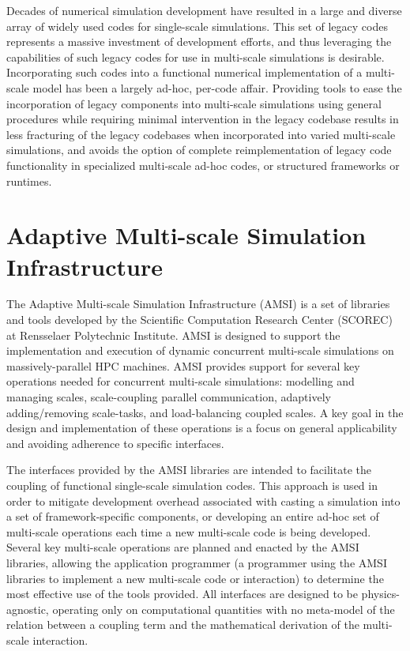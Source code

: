 \documentclass[11pt]{article}
\begin{document}
Decades of numerical simulation development have resulted in a large and diverse array of widely used codes for single-scale simulations. 
This set of legacy codes represents a massive investment of development efforts, and thus leveraging the capabilities of such legacy codes for use in multi-scale simulations is desirable. 
Incorporating such codes into a functional numerical implementation of a multi-scale model has been a largely ad-hoc, per-code affair. 
Providing tools to ease the incorporation of legacy components into multi-scale simulations using general procedures while requiring minimal intervention in the legacy codebase results in less fracturing of the legacy codebases when incorporated into varied multi-scale simulations, and avoids the option of complete reimplementation of legacy code functionality in specialized multi-scale ad-hoc codes, or structured frameworks or runtimes.

\section{Adaptive Multi-scale Simulation Infrastructure}\label{AMSI}
The Adaptive Multi-scale Simulation Infrastructure (AMSI) is a set of libraries and tools developed by the Scientific Computation Research Center (SCOREC) at Rensselaer Polytechnic Institute. 
AMSI is designed to support the implementation and execution of dynamic concurrent multi-scale simulations on massively-parallel HPC machines.
AMSI provides support for several key operations needed for concurrent multi-scale simulations: modelling and managing scales, scale-coupling parallel communication, adaptively adding/removing scale-tasks, and load-balancing coupled scales. 
A key goal in the design and implementation of these operations is a focus on general applicability and avoiding adherence to specific interfaces.

The interfaces provided by the AMSI libraries are intended to facilitate the coupling of functional single-scale simulation codes.
This approach is used in order to mitigate development overhead associated with casting a simulation into a set of framework-specific components, or developing an entire ad-hoc set of multi-scale operations each time a new multi-scale code is being developed.
Several key multi-scale operations are planned and enacted by the AMSI libraries, allowing the application programmer (a programmer using the AMSI libraries to implement a new multi-scale code or interaction) to determine the most effective use of the tools provided. 
All interfaces are designed to be physics-agnostic, operating only on computational quantities with no meta-model of the relation between a coupling term and the mathematical derivation of the multi-scale interaction.
\end{document}
